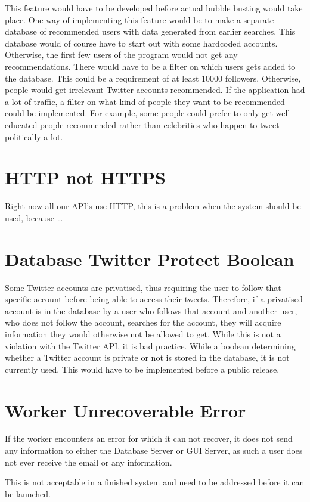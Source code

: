 This feature would have to be developed before actual bubble busting would take
place. One way of implementing this feature would be to make a separate
database of recommended users with data generated from earlier searches. This
database would of course have to start out with some hardcoded accounts.
Otherwise, the first few users of the program would not get any
recommendations. There would have to be a filter on which users gets added to
the database. This could be a requirement of at least 10000 followers.
Otherwise, people would get irrelevant Twitter accounts recommended. If the
application had a lot of traffic, a filter on what kind of people they want to
be recommended could be implemented. For example, some people could prefer to
only get well educated people recommended rather than celebrities who happen to
tweet politically a lot.


\section{HTTP not HTTPS}
Right now all our \ac{API}'s use HTTP, this is a problem when the system should
be used, because \ldots {}


\section{Database Twitter Protect Boolean}\label{sec:twitterProtect}
Some Twitter accounts are privatised, thus requiring the user to follow that
specific account before being able to access their tweets. Therefore, if a
privatised account is in the database by a user who follows that account and
another user, who does not follow the account, searches for the account, they
will acquire information they would otherwise not be allowed to get. While this
is not a violation with the Twitter API, it is bad practice. While a boolean
determining whether a Twitter account is private or not is stored in the
database, it is not currently used. This would have to be implemented before a
public release.

\section{Worker Unrecoverable Error}
If the worker encounters an error for which it can not recover, it does not send
any information to either the Database Server or GUI Server, as such a user does
not ever receive the email or any information. \nl

This is not acceptable in a finished system and need to be addressed before it
can be launched.


